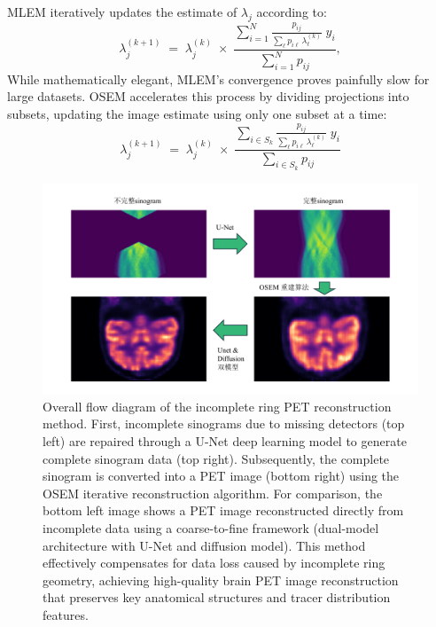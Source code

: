 \documentclass[
reprint,
superscriptaddress,
nofootinbib,
amsmath,amssymb,
aps,
prd,
]{revtex4-2}
\begin{document}
MLEM iteratively updates the estimate of $\lambda_j$ according to:
\begin{equation}
    \lambda_j^{(k+1)}
    \;=\;
    \lambda_j^{(k)}
    \;\times\;
    \frac{\displaystyle \sum_{i=1}^{N} \frac{p_{ij}}{\sum_{\ell} p_{i\ell}\,\lambda_{\ell}^{(k)}} \; y_i}
    {\displaystyle \sum_{i=1}^{N} p_{ij}}  ,
\end{equation}
While mathematically elegant, MLEM's convergence proves painfully slow for large datasets. OSEM accelerates this process by dividing projections into subsets, updating the image estimate using only one subset at a time:
\begin{equation}
    \lambda_j^{(k+1)}
\;=\;
\lambda_j^{(k)}
\;\times\;
\frac{\displaystyle \sum_{i \in S_{k}} \frac{p_{ij}}{\sum_{\ell} p_{i\ell}\,\lambda_{\ell}^{(k)}} \; y_i}
{\displaystyle \sum_{i \in S_{k}} p_{ij}}
\end{equation}
\begin{figure}[ht]
    \centering
    \includegraphics[width=\textwidth]{Images/reconstruction_workflow}
    \vspace{-.5cm}
    \caption{Overall flow diagram of the incomplete ring PET reconstruction method. First, incomplete sinograms due to missing detectors (top left) are repaired through a U-Net deep learning model to generate complete sinogram data (top right). Subsequently, the complete sinogram is converted into a PET image (bottom right) using the OSEM iterative reconstruction algorithm. For comparison, the bottom left image shows a PET image reconstructed directly from incomplete data using a coarse-to-fine framework (dual-model architecture with U-Net and diffusion model). This method effectively compensates for data loss caused by incomplete ring geometry, achieving high-quality brain PET image reconstruction that preserves key anatomical structures and tracer distribution features.}
    \vspace{-.2cm}
    \label{fig:reconstruction_workflow}
\end{figure}
\end{document}
